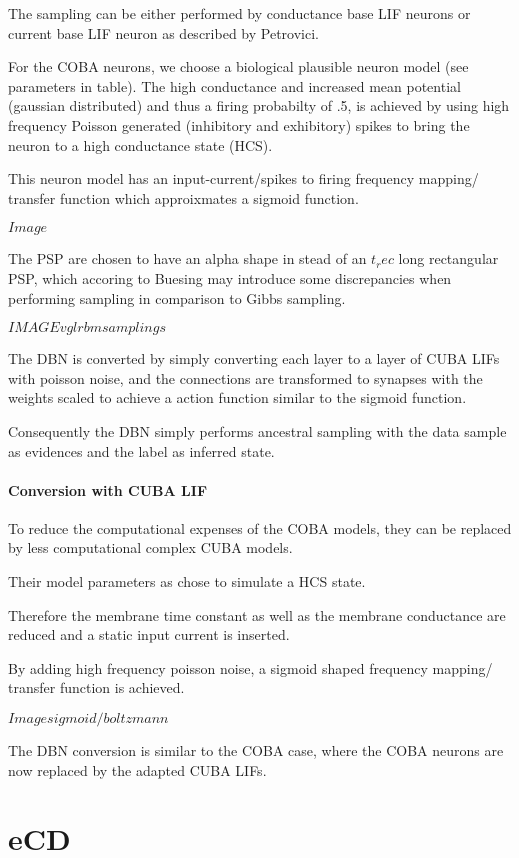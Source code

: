 The sampling can be either performed by conductance base LIF neurons or current base LIF neuron as described by Petrovici.

For the COBA neurons, we choose a biological plausible neuron model (see parameters in table). 
The high conductance and increased mean potential (gaussian distributed) and thus a firing probabilty of .5, is achieved by using high frequency Poisson generated (inhibitory and exhibitory) spikes to bring the neuron to a high conductance state (HCS). 

This neuron model has an input-current/spikes to firing frequency mapping/ transfer function which approixmates a sigmoid function.

$Image$

The PSP are chosen to have an alpha shape in stead of an $t_rec$ long rectangular PSP, which accoring to Buesing may introduce some discrepancies when performing sampling in comparison to Gibbs sampling.

$IMAGE vgl rbm samplings$     
  
The DBN is converted by simply converting each layer to a layer of CUBA LIFs with poisson noise, and the connections are transformed to synapses with the weights scaled to achieve a action function similar to the sigmoid function.

Consequently the DBN simply performs ancestral sampling with the data sample as evidences and the label as inferred state.   


\paragraph{Conversion with CUBA LIF}

To reduce the computational expenses of the COBA models, they can be replaced by less computational complex CUBA models.

Their model parameters as chose to simulate a HCS state.

Therefore the membrane time constant as well as the membrane conductance are reduced and a static input current is inserted.  

By adding high frequency poisson noise, a sigmoid shaped frequency mapping/ transfer function is achieved.

$Image sigmoid/ boltzmann$

The DBN conversion is similar to the COBA case, where the COBA neurons are now replaced by the adapted CUBA LIFs.

\section{eCD}

